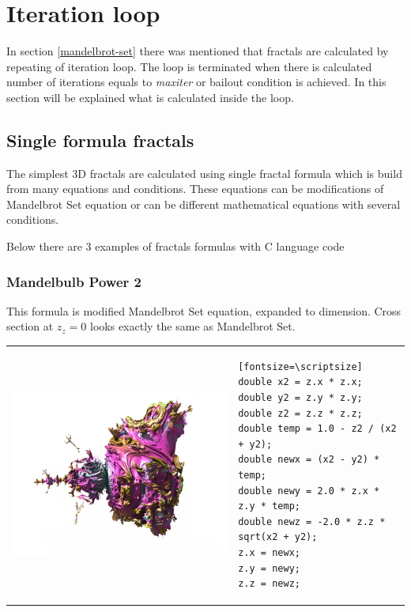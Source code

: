 \section{Iteration loop}\label{iteration-loop}

In section \ref{mandelbrot-set} there was mentioned that fractals are calculated by repeating of iteration loop. The loop is terminated when there is calculated number of iterations equals to \emph{maxiter} or bailout condition is achieved.
In this section will be explained what is calculated inside the loop.

\subsection{Single formula fractals}\label{single-formula-fractals}

The simplest 3D fractals are calculated using single fractal formula which is build from many equations and conditions. These equations can be modifications of Mandelbrot Set equation or can be different mathematical equations with several conditions.

Below there are 3 examples of fractals formulas with C language code

\subsubsection{Mandelbulb Power 2}
\nopagebreak

This formula is modified Mandelbrot Set equation, expanded to  dimension. Cross section at $ z_z = 0 $ looks exactly the same as Mandelbrot Set.
\nopagebreak

\begin{tabular}{l l}
	\includegraphics[width=0.3\linewidth]{img/manual/media/formula_mandelbulb_power_2}	
	& 
	\begin{minipage}[b]{0.5\linewidth}
		\begin{verbatim}[fontsize=\scriptsize]
double x2 = z.x * z.x;
double y2 = z.y * z.y;
double z2 = z.z * z.z;
double temp = 1.0 - z2 / (x2 + y2);
double newx = (x2 - y2) * temp;
double newy = 2.0 * z.x * z.y * temp;
double newz = -2.0 * z.z * sqrt(x2 + y2);
z.x = newx;
z.y = newy;
z.z = newz;
		\end{verbatim}
	\end{minipage}
\end{tabular} 

